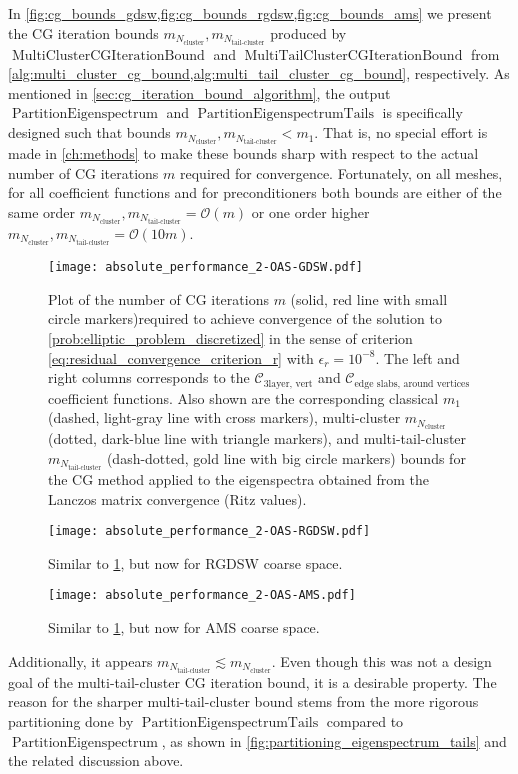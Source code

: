 In \cref{fig:cg_bounds_gdsw,fig:cg_bounds_rgdsw,fig:cg_bounds_ams} we present the CG iteration bounds $m_{N_{\text{cluster}}}, m_{N_{\text{tail-cluster}}}$ produced by $\operatorname{MultiClusterCGIterationBound}$ and $\operatorname{MultiTailClusterCGIterationBound}$ from \cref{alg:multi_cluster_cg_bound,alg:multi_tail_cluster_cg_bound}, respectively. As mentioned in \cref{sec:cg_iteration_bound_algorithm}, the output $\operatorname{PartitionEigenspectrum}$ and $\operatorname{PartitionEigenspectrumTails}$ is specifically designed such that bounds $m_{N_{\text{cluster}}}, m_{N_{\text{tail-cluster}}} < m_1$. That is, no special effort is made in \cref{ch:methods} to make these bounds sharp with respect to the actual number of CG iterations $m$ required for convergence. Fortunately, on all meshes, for all coefficient functions and for preconditioners both bounds are either of the same order $m_{N_{\text{cluster}}}, m_{N_{\text{tail-cluster}}} = \mathcal{O}(m)$ or one order higher $m_{N_{\text{cluster}}}, m_{N_{\text{tail-cluster}}} = \mathcal{O}(10m)$.
\begin{figure}[H]
    \centering
    \texttt{[image: absolute\_performance\_2-OAS-GDSW.pdf]}
    \caption{Plot of the number of CG iterations $m$ (solid, red line with small circle markers)required to achieve convergence of the solution to \cref{prob:elliptic_problem_discretized} in the sense of criterion \cref{eq:residual_convergence_criterion_r} with $\epsilon_r=10^{-8}$. The left and right columns corresponds to the $\mathcal{C}_{\text{3layer, vert}}$ and $\mathcal{C}_{\text{edge slabs, around vertices}}$ coefficient functions. Also shown are the corresponding classical $m_1$ (dashed, light-gray line with cross markers), multi-cluster $m_{N_{\text{cluster}}}$ (dotted, dark-blue line with triangle markers), and multi-tail-cluster $m_{N_{\text{tail-cluster}}}$ (dash-dotted, gold line with big circle markers) bounds for the CG method applied to the eigenspectra obtained from the Lanczos matrix convergence (Ritz values).}
    \label{fig:cg_bounds_gdsw}
\end{figure}
\begin{figure}[H]
    \centering\texttt{[image: absolute\_performance\_2-OAS-RGDSW.pdf]}
    \caption{Similar to \cref{fig:cg_bounds_gdsw}, but now for RGDSW coarse space.}
    \label{fig:cg_bounds_rgdsw}
\end{figure}
\begin{figure}[H]
    \centering\texttt{[image: absolute\_performance\_2-OAS-AMS.pdf]}
    \caption{Similar to \cref{fig:cg_bounds_gdsw}, but now for AMS coarse space.}
    \label{fig:cg_bounds_ams}
\end{figure}
Additionally, it appears $m_{N_{\text{tail-cluster}}} \lesssim m_{N_{\text{cluster}}}$. Even though this was not a design goal of the multi-tail-cluster CG iteration bound, it is a desirable property. The reason for the sharper multi-tail-cluster bound stems from the more rigorous partitioning done by $\operatorname{PartitionEigenspectrumTails}$ compared to $\operatorname{PartitionEigenspectrum}$, as shown in \cref{fig:partitioning_eigenspectrum_tails} and the related discussion above.

